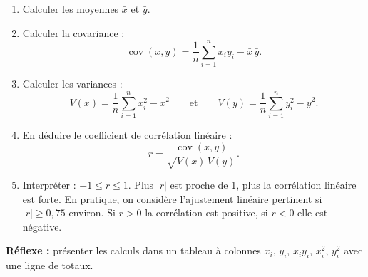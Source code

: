 \documentclass[11pt]{article}
\newcommand{\cle}[1]{{\popxbold\color{popdark}#1}}
\begin{document}
\begin{methode}
\begin{enumerate}
\item Calculer les moyennes $\bar{x}$ et $\bar{y}$.
\item Calculer la \cle{covariance} :
\[ \operatorname{cov}(x,y) = \frac{1}{n}\sum_{i=1}^{n} x_i y_i - \bar{x}\,\bar{y}. \]
\item Calculer les \cle{variances} :
\[ V(x) = \frac{1}{n}\sum_{i=1}^{n} x_i^2 - \bar{x}^2 \qquad \text{et} \qquad V(y) = \frac{1}{n}\sum_{i=1}^{n} y_i^2 - \bar{y}^2. \]
\item En déduire le \cle{coefficient de corrélation linéaire} :
\[ r = \frac{\operatorname{cov}(x,y)}{\sqrt{V(x)\,V(y)}}. \]
\item Interpréter : $-1 \leq r \leq 1$. Plus $|r|$ est proche de 1, plus la corrélation linéaire est forte. En pratique, on considère l'ajustement linéaire pertinent si $|r| \geq 0{,}75$ environ. Si $r > 0$ la corrélation est positive, si $r < 0$ elle est négative.
\end{enumerate}
\textbf{Réflexe :} présenter les calculs dans un tableau à colonnes $x_i$, $y_i$, $x_i y_i$, $x_i^2$, $y_i^2$ avec une ligne de totaux.
\end{methode}
\end{document}
